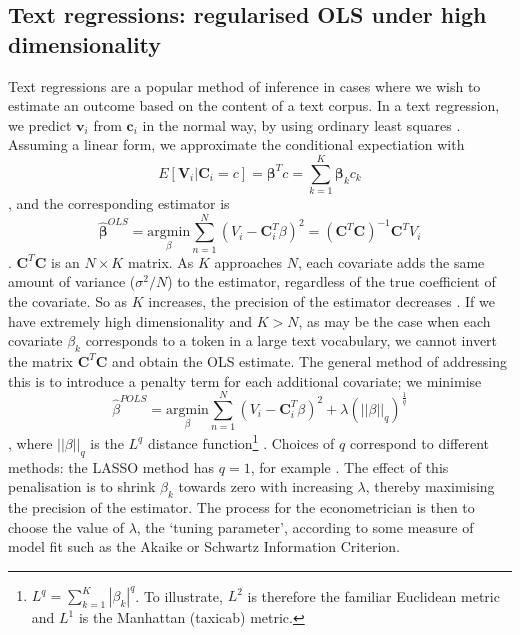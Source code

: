 \documentclass{article}
\begin{document}
\subsection{Text regressions: regularised OLS under high dimensionality}
Text regressions are a popular method of inference in cases where we wish to estimate an outcome based on the content of a text corpus.  In a text regression, we predict \(\mathbf{v}_i\) from \(\mathbf{c}_i\) in the normal way, by using ordinary least squares \parencite[541]{gentzkowTextData2019}. Assuming a linear form, we approximate the conditional expectiation with
\[
    E[\mathbf{V}_i | \mathbf{C}_i = c] = \mathbf{\beta}^T c = \sum^K_{k=1} \mathbf{\beta}_k c_k
\]
, and the corresponding estimator is 
\[ 
    \hat{\mathbf{\beta}}^{OLS} = \underset{\beta}{\mathrm{argmin }} \sum^N_{n=1} (V_i - \mathbf{C}_i^T \beta)^2 = (\mathbf{C}^T \mathbf{C})^{-1}\mathbf{C}^T V_i
\]. \(\mathbf{C}^T \mathbf{C}\) is an \(N \times K\) matrix. As \(K\) approaches \(N\), each covariate adds the same amount of variance (\(\sigma^2 / N\)) to the estimator, regardless of the true coefficient of the covariate. So as \(K\) increases, the precision of the estimator decreases \parencite[101]{davidsonEconometricTheoryMethods2004}. If we have extremely high dimensionality and \(K > N\), as may be the case when each covariate \(\beta_k\) corresponds to a token in a large text vocabulary, we cannot invert the matrix \(\mathbf{C}^T \mathbf{C}\) and obtain the OLS estimate. The general method of addressing this is to introduce a penalty term for each additional covariate; we minimise 
\[
    \hat{\beta}^{POLS} = \underset{\beta}{\mathrm{argmin }} \sum^N_{n=1} (V_i - \mathbf{C}_i^T \beta)^2  + \lambda (||\beta||_q)^{\frac{1}{q}}
\], where \(||\beta||_q\) is the  \(L^q\) distance function\footnote{\(L^q = \sum^K_{k=1}|\beta_k|^q\). To illustrate, \(L^2\) is therefore the familiar Euclidean metric and \(L^1\) is the Manhattan (taxicab) metric.} \parencite[696]{atheyMachineLearningMethods2019a}. Choices of \(q\) correspond to different methods: the LASSO method has \(q =1\), for example \parencite{tibshiraniRegressionShrinkageSelection1996}.  The effect of this penalisation is to shrink \(\beta_k\) towards zero with increasing \(\lambda\), thereby maximising the precision of the estimator. The process for the econometrician is then to choose the value of \(\lambda\), the `tuning parameter', according to some measure of model fit such as the Akaike or Schwartz Information Criterion.    
\end{document}
